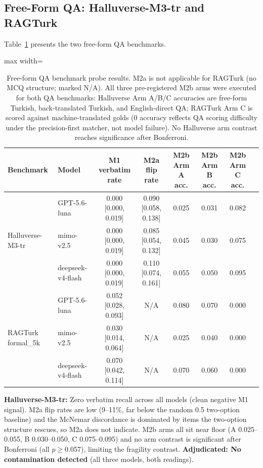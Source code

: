 \documentclass[letterpaper]{article}
\begin{document}
\subsection{Free-Form QA: Halluverse-M3-tr and RAGTurk}
Table~\ref{tab:qa} presents the two free-form QA benchmarks.

\begin{table}[t]
\centering
\begin{adjustbox}{max width=\textwidth}
\begin{tabular}{llcccccc}
\toprule
\textbf{Benchmark} & \textbf{Model} & \textbf{M1 verbatim rate} & \textbf{M2a flip rate} & \textbf{M2b Arm A acc.} & \textbf{M2b Arm B acc.} & \textbf{M2b Arm C acc.} \\
\midrule
\multirow{3}{*}{Halluverse-M3-tr} & GPT-5.6-luna & 0.000 [0.000, 0.019] & 0.090 [0.058, 0.138] & 0.025 & 0.031 & 0.082 \\
 & mimo-v2.5 & 0.000 [0.000, 0.019] & 0.085 [0.054, 0.132] & 0.045 & 0.030 & 0.075 \\
 & deepseek-v4-flash & 0.000 [0.000, 0.019] & 0.110 [0.074, 0.161] & 0.055 & 0.050 & 0.095 \\
\midrule
\multirow{3}{*}{RAGTurk formal\_5k} & GPT-5.6-luna & 0.052 [0.028, 0.093] & N/A & 0.080 & 0.070 & 0.000 \\
 & mimo-v2.5 & 0.030 [0.014, 0.064] & N/A & 0.025 & 0.040 & 0.000 \\
 & deepseek-v4-flash & 0.070 [0.042, 0.114] & N/A & 0.070 & 0.060 & 0.000 \\
\bottomrule
\end{tabular}%
\end{adjustbox}
\caption{Free-form QA benchmark probe results. M2a is not applicable for RAGTurk (no MCQ structure; marked N/A). All three pre-registered M2b arms were executed for both QA benchmarks: Halluverse Arm A/B/C accuracies are free-form Turkish, back-translated Turkish, and English-direct QA; RAGTurk Arm C is scored against machine-translated golds (0 accuracy reflects QA scoring difficulty under the precision-first matcher, not model failure). No Halluverse arm contrast reaches significance after Bonferroni.}
\label{tab:qa}
\end{table}

\textbf{Halluverse-M3-tr:} Zero verbatim recall across all models (clean negative M1 signal). M2a flip rates are low (9--11\%, far below the random 0.5 two-option baseline) and the McNemar discordance is dominated by items the two-option structure rescues, so M2a does not indicate. M2b arms all sit near floor (A 0.025--0.055, B 0.030--0.050, C 0.075--0.095) and no arm contrast is significant after Bonferroni (all $p\geq$0.057), limiting the fragility contrast. \textbf{Adjudicated: No contamination detected} (all three models, both readings).
\end{document}
